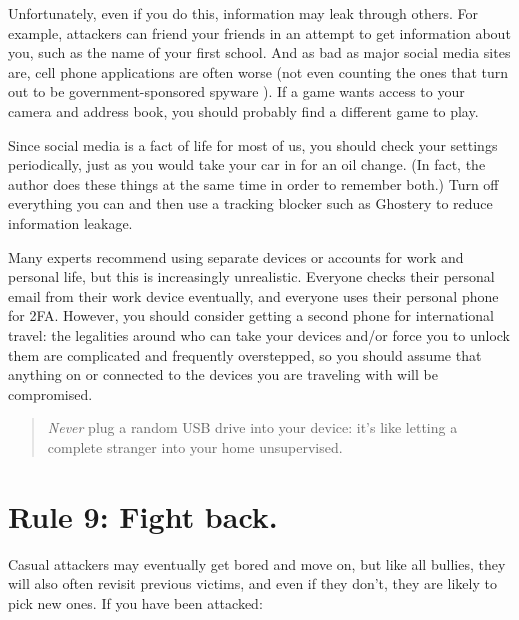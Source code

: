 \documentclass[10pt,letterpaper]{article}
\begin{document}
Unfortunately,
even if you do this,
information may leak through others.
For example,
attackers can friend your friends in an attempt to get information about you,
such as the name of your first school.
And as bad as major social media sites are,
cell phone applications are often worse
(not even counting the ones that turn out to be government-sponsored spyware \cite{Schn2019}).
If a game wants access to your camera and address book,
you should probably find a different game to play.

Since social media is a fact of life for most of us,
you should check your settings periodically,
just as you would take your car in for an oil change.
(In fact,
the author does these things at the same time in order to remember both.)
Turn off everything you can
and then use a tracking blocker such as Ghostery to reduce information leakage.

Many experts recommend using separate devices or accounts for work and personal life,
but this is increasingly unrealistic.
Everyone checks their personal email from their work device eventually,
and everyone uses their personal phone for 2FA.
However,
you should consider getting a second phone for international travel:
the legalities around who can take your devices
and/or force you to unlock them are complicated and frequently overstepped,
so you should assume that anything on or connected to the devices you are traveling with
will be compromised.

\begin{quote}
  \emph{Never} plug a random USB drive into your device:
  it's like letting a complete stranger into your home unsupervised.
\end{quote}

\section*{Rule 9: Fight back.}

Casual attackers may eventually get bored and move on,
but like all bullies,
they will also often revisit previous victims,
and even if they don't,
they are likely to pick new ones.
If you have been attacked:
\end{document}
